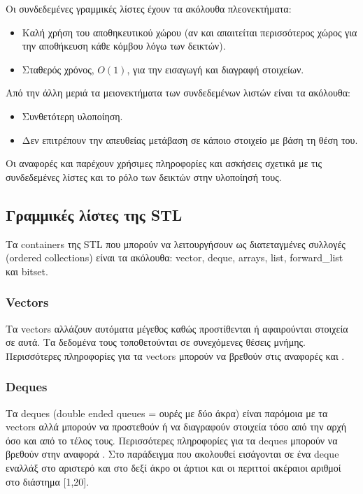 






\noindent Οι συνδεδεμένες γραμμικές λίστες έχουν τα ακόλουθα πλεονεκτήματα:
\begin{itemize}[nolistsep]
\item Καλή χρήση του αποθηκευτικού χώρου (αν και απαιτείται περισσότερος χώρος για την αποθήκευση κάθε κόμβου λόγω των δεικτών). 
\item Σταθερός χρόνος, $O(1)$, για την εισαγωγή και διαγραφή στοιχείων.
\end{itemize}

\noindent Από την άλλη μεριά τα μειονεκτήματα των συνδεδεμένων λιστών είναι τα ακόλουθα:
\begin{itemize}[nolistsep]
\item Συνθετότερη υλοποίηση.
\item Δεν επιτρέπουν την απευθείας μετάβαση σε κάποιο στοιχείο με βάση τη θέση του.
\end{itemize}

Οι αναφορές \cite{csstanford103} και \cite{csstanford105} παρέχουν χρήσιμες πληροφορίες και ασκήσεις σχετικά με τις συνδεδεμένες λίστες και το ρόλο των δεικτών στην υλοποίησή τους.

\subsection{Γραμμικές λίστες της STL}
Τα containers της STL που μπορούν να λειτουργήσουν ως διατεταγμένες συλλογές (ordered collections) είναι τα ακόλουθα: vector, deque, arrays, list, forward\_list και bitset. 

\subsubsection{Vectors}
Τα vectors αλλάζουν αυτόματα μέγεθος καθώς προστίθενται ή αφαιρούνται στοιχεία σε αυτά. Τα δεδομένα τους τοποθετούνται σε συνεχόμενες θέσεις μνήμης. Περισσότερες πληροφορίες για τα vectors μπορούν να βρεθούν στις αναφορές \cite{g4gvector} και \cite{codecogsvector}.

\subsubsection{Deques}
Τα deques (double ended queues = ουρές με δύο άκρα) είναι παρόμοια με τα vectors αλλά μπορούν να προστεθούν ή να διαγραφούν στοιχεία τόσο από την αρχή όσο και από το τέλος τους. Περισσότερες πληροφορίες για τα deques μπορούν να βρεθούν στην αναφορά \cite{g4gdeque}. Στο παράδειγμα που ακολουθεί εισάγονται σε ένα deque εναλλάξ στο αριστερό και στο δεξί άκρο οι άρτιοι και οι περιττοί ακέραιοι αριθμοί στο διάστημα [1,20].

